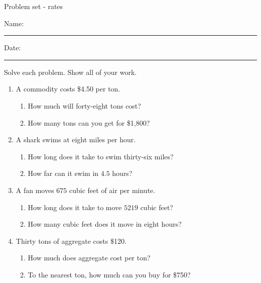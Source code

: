 \documentclass[12pt]{article}
\begin{document}
\pagestyle{empty} %
\begin{center}
          Problem set - rates \\[0.5in]
\end{center}
Name: \rule{4in}{0.005in} Date: \rule{1.5in}{0.005in} 
  \vspace{0.25in}

Solve each problem. Show all of your work. 

\begin{enumerate}
		\newcommand{\spacing}{\vspace{0.70in}}

\item A commodity costs \$4.50 per ton. 
	\begin{enumerate}
		\item How much will forty-eight tons cost? 
\spacing

		\item How many tons can you get for \$1,800? 
\spacing
	\end{enumerate}

\item A shark swims at eight miles per hour.  
	\begin{enumerate}
		\item How long does it take to swim thirty-six miles? 
\spacing

		\item How far can it swim in $4.5$ hours? 
\spacing
	\end{enumerate}

\item A fan moves $675$ cubic feet of air per minute.   
	\begin{enumerate}
		\item How long does it take to move $5219$ cubic feet?  
\spacing

		\item How many cubic feet does it move in eight hours? 
\spacing
	\end{enumerate}

\pagebreak
		 
\item Thirty tons of aggregate costs \$120.   
	\begin{enumerate}
		\item How much does aggregate cost per ton?
\spacing

		\item To the nearest ton, how much can you buy for \$750?
\spacing
	\end{enumerate}


\end{enumerate}
\end{document}
